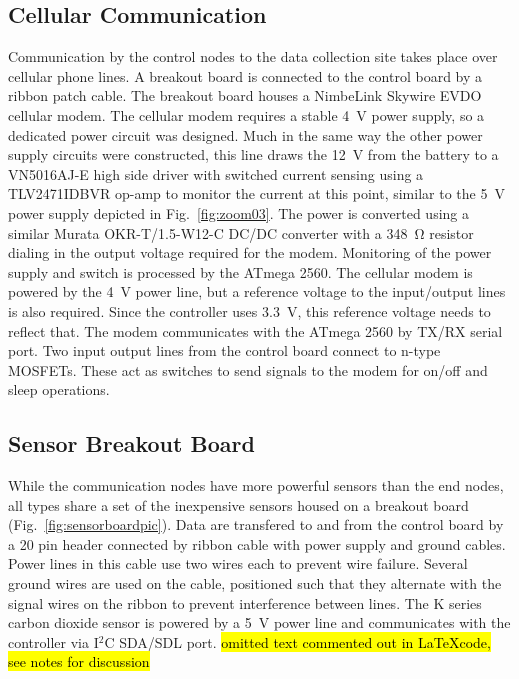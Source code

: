 \documentclass[numbook, envcountsect, envcountsame, envcountreset, runningheads, twocolumn]{svjour3}
\begin{document}
		\subsection{Cellular Communication}
			\label{sec:cellsection}
			Communication by the control nodes to the data collection site takes place over cellular phone lines.  A breakout board is connected to the control board by a ribbon patch cable.  The breakout board houses a NimbeLink Skywire EVDO cellular modem.  The cellular modem requires a stable \SI{4}{\volt} power supply, so a dedicated power circuit was designed.  Much in the same way the other power supply circuits were constructed, this line draws the \SI{12}{\volt} from the battery to a VN5016AJ-E high side driver with switched current sensing using a TLV2471IDBVR op-amp to monitor the current at this point, similar to the \SI{5}{\volt} power supply depicted in Fig.~\ref{fig:zoom03}.  The power is converted using a similar Murata OKR-T/1.5-W12-C DC/DC converter with a \SI{348}{\ohm} resistor dialing in the output voltage required for the modem.  Monitoring of the power supply and switch is processed by the ATmega 2560.  The cellular modem is powered by the \SI{4}{\volt} power line, but a reference voltage to the input/output lines is also required.  Since the controller uses \SI{3.3}{\volt}, this reference voltage needs to reflect that.  The modem communicates with the ATmega 2560 by TX/RX serial port.  Two input output lines from the control board connect to n-type MOSFETs.  These act as switches to send signals to the modem for on/off and sleep operations.  
			
		\subsection{Sensor Breakout Board}
			While the communication nodes have more powerful sensors than the end nodes, all types share a set of the inexpensive sensors housed on a breakout board (Fig.~\ref{fig:sensorboardpic}).  Data are transfered to and from the control board by a 20 pin header connected by ribbon cable with power supply and ground cables.  Power lines in this cable use two wires each to prevent wire failure.  Several ground wires are used on the cable, positioned such that they alternate with the signal wires on the ribbon to prevent interference between lines.  The K series carbon dioxide sensor is powered by a \SI{5}{\volt} power line and communicates with the controller via I$^2$C SDA/SDL port.  \hl{omitted text commented out in \LaTeX code, see notes for discussion}
			
\end{document}
